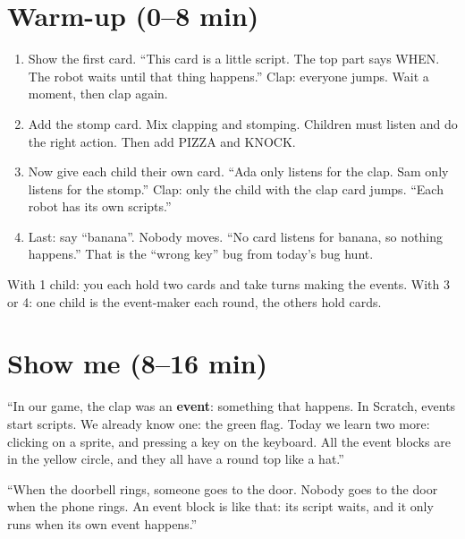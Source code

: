 \section{Warm-up (0--8 min)}
\begin{unplugged}
\begin{enumerate}[leftmargin=1.4em,itemsep=1pt]
  \item Show the first card. \enquote{This card is a little script. The top part says WHEN. The robot waits until that thing happens.} Clap: everyone jumps. Wait a moment, then clap again.
  \item Add the stomp card. Mix clapping and stomping. Children must listen and do the right action. Then add PIZZA and KNOCK.
  \item Now give each child their own card. \enquote{Ada only listens for the clap. Sam only listens for the stomp.} Clap: only the child with the clap card jumps. \enquote{Each robot has its own scripts.}
  \item Last: say \enquote{banana}. Nobody moves. \enquote{No card listens for banana, so nothing happens.} That is the \enquote{wrong key} bug from today's bug hunt.
\end{enumerate}
With 1 child: you each hold two cards and take turns making the events. With 3 or 4: one child is the event-maker each round, the others hold cards.
\end{unplugged}

\section{Show me (8--16 min)}
\begin{teacherscript}
\enquote{In our game, the clap was an \textbf{event}: something that happens. In Scratch, events start scripts. We already know one: the green flag. Today we learn two more: clicking on a sprite, and pressing a key on the keyboard. All the event blocks are in the yellow  circle, and they all have a round top like a hat.}
\end{teacherscript}

\begin{analogy}
\enquote{When the doorbell rings, someone goes to the door. Nobody goes to the door when the phone rings. An event block is like that: its script waits, and it only runs when its own event happens.}
\end{analogy}

